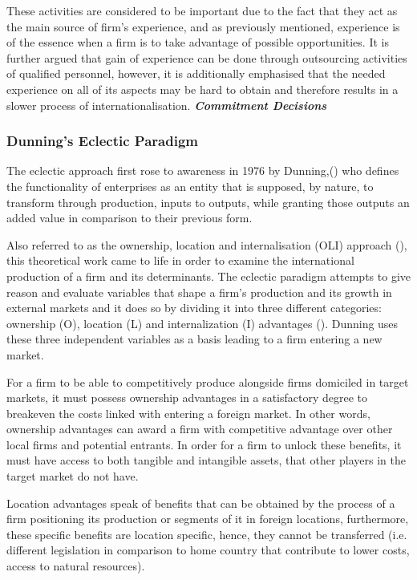 \documentclass[12pt,a4paper]{article}
\begin{document}
These activities are considered to be important due to the fact that they act as the main source of firm's experience, and as previously mentioned, experience is of the essence when a firm is to take advantage of possible opportunities. It is further argued that gain of experience can be done through outsourcing activities of qualified personnel, however, it is additionally emphasised that the needed experience on all of its aspects may be hard to obtain and therefore results in a slower process of internationalisation. 
\textbf{\textit{Commitment Decisions}}




\subsubsection{Dunning's Eclectic Paradigm}
The eclectic approach first rose to awareness in 1976 by Dunning,(\cite{eclectic_paradigm_dunning_extension}) who defines the functionality of enterprises as an entity that is supposed, by nature, to transform through production, inputs to outputs, while granting those outputs an added value in comparison to their previous form. \par
Also referred to as the ownership, location and internalisation (OLI) approach (\cite{eclectic_paradigm_dunning}), this theoretical work came to life in order to examine the international production of a firm and its determinants. The eclectic paradigm attempts to give reason and evaluate variables that shape a firm's production and its growth in external markets and it does so by dividing it into three different categories: ownership (O), location (L) and internalization (I) advantages (\cite{Dunning_moremore}). Dunning uses these three independent variables as a basis leading to a firm entering a new market. \par
For a firm to be able to competitively produce alongside firms domiciled in target markets, it must possess ownership advantages in a satisfactory degree to breakeven the costs linked with entering a foreign market. In other words, ownership advantages can award a firm with competitive advantage over other local firms and potential entrants. In order for a firm to unlock these benefits, it must have access to both tangible and intangible assets, that other players in the target market do not have.  \par
Location advantages speak of benefits that can be obtained by the process of a firm positioning its production or segments of it in foreign locations, furthermore, these specific benefits are location specific, hence, they cannot be transferred (i.e. different legislation in comparison to home country that contribute to lower costs, access to natural resources). \par
\end{document}
